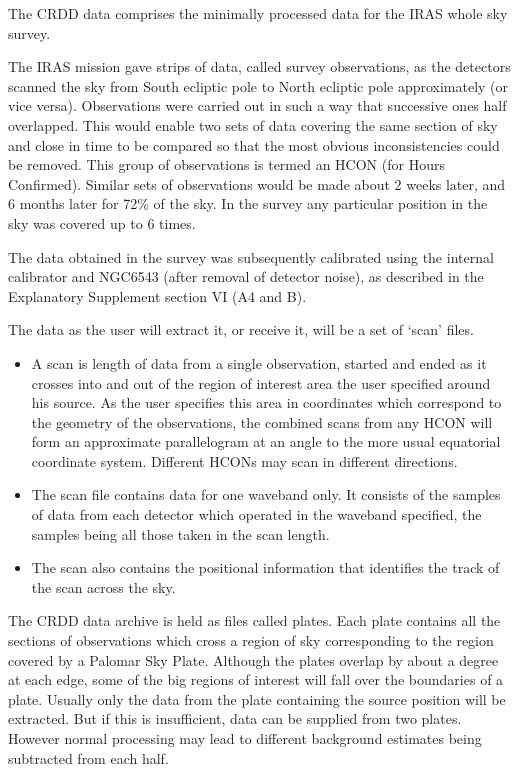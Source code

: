 \documentclass[twoside,11pt]{starlink}
\begin{document}
The CRDD data comprises the minimally processed data for the IRAS whole sky
survey.

The IRAS mission gave strips of data, called survey observations, as the
detectors scanned the sky from South ecliptic pole to North ecliptic pole
approximately (or vice versa). Observations were carried out in such a way that
successive ones half overlapped. This would enable two sets of data covering
the same section of sky and close in time to be compared so that the most
obvious inconsistencies could be removed. This group of observations is termed
an HCON (for Hours Confirmed). Similar sets of observations would be made
about 2 weeks later, and 6 months later for 72\% of the sky. In the survey any
particular position in the sky was covered up to 6 times.

The data obtained in the survey was subsequently calibrated using the internal
calibrator and NGC6543 (after removal of detector noise), as described in the
Explanatory Supplement section VI (A4 and B).

The data as the user will extract it, or receive it, will be a set of `scan'
files.
\begin{itemize}
\item A scan is length of data from a single observation, started and ended as
it crosses into and out of the region of interest area the user specified
around his source. As the user specifies this area in coordinates which
correspond to the geometry of the observations, the combined scans from any
HCON will form an approximate parallelogram at an angle to the more usual
equatorial coordinate system. Different HCONs may scan in different directions.
\item The scan file contains data for one waveband only. It consists of the
samples of data from each detector which operated in the waveband specified,
the samples being all those taken in the scan length.
\item The scan also contains the positional information that identifies the
track of the scan across the sky.
\end{itemize}

The CRDD data archive is held as files called plates. Each plate contains all
the sections of observations which cross a region of sky corresponding to the
region covered by a Palomar Sky Plate. Although the plates overlap by about a
degree at each edge, some of the big regions of interest will fall over the
boundaries of a plate. Usually only the data from the plate containing the
source position will be extracted. But if this is insufficient, data can be
supplied from two plates. However normal processing may lead to different
background estimates being subtracted from each half.
\end{document}
